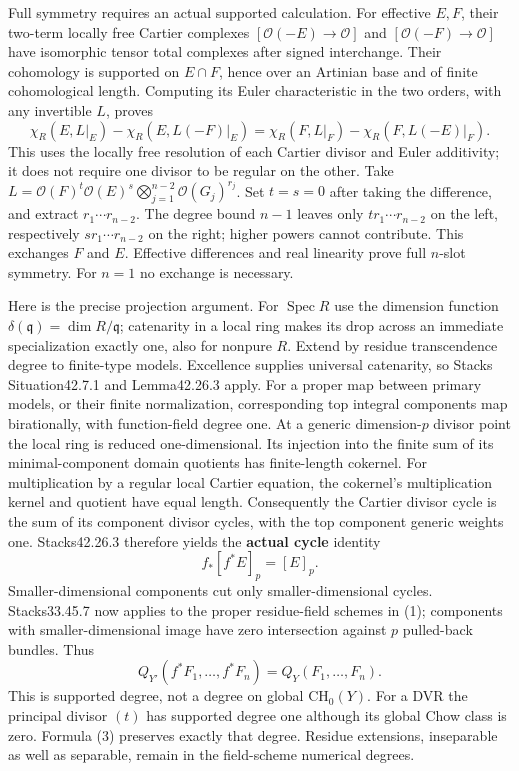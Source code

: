 \documentclass[
  11pt,
]{article}
\begin{document}
Full symmetry requires an actual supported calculation. For effective
\(E,F\), their two-term locally free Cartier complexes
\([\mathcal O(-E)\to\mathcal O]\) and \([\mathcal O(-F)\to\mathcal O]\)
have isomorphic tensor total complexes after signed interchange. Their
cohomology is supported on \(E\cap F\), hence over an Artinian base and
of finite cohomological length. Computing its Euler characteristic in
the two orders, with any invertible \(L\), proves
\[\chi_R(E,L|_E)-\chi_R(E,L(-F)|_E)=\chi_R(F,L|_F)-\chi_R(F,L(-E)|_F).\tag{2}\]
This uses the locally free resolution of each Cartier divisor and Euler
additivity; it does not require one divisor to be regular on the other.
Take
\(L=\mathcal O(F)^t\mathcal O(E)^s\bigotimes_{j=1}^{n-2}\mathcal O(G_j)^{r_j}\).
Set \(t=s=0\) after taking the difference, and extract
\(r_1\cdots r_{n-2}\). The degree bound \(n-1\) leaves only
\(t r_1\cdots r_{n-2}\) on the left, respectively
\(s r_1\cdots r_{n-2}\) on the right; higher powers cannot contribute.
This exchanges \(F\) and \(E\). Effective differences and real linearity
prove full \(n\)-slot symmetry. For \(n=1\) no exchange is necessary.

Here is the precise projection argument. For \(\operatorname{Spec}R\)
use the dimension function \(\delta(\mathfrak q)=\dim R/\mathfrak q\);
catenarity in a local ring makes its drop across an immediate
specialization exactly one, also for nonpure \(R\). Extend by residue
transcendence degree to finite-type models. Excellence supplies
universal catenarity, so Stacks Situation42.7.1 and Lemma42.26.3 apply.
For a proper map between primary models, or their finite normalization,
corresponding top integral components map birationally, with
function-field degree one. At a generic dimension-\(p\) divisor point
the local ring is reduced one-dimensional. Its injection into the finite
sum of its minimal-component domain quotients has finite-length
cokernel. For multiplication by a regular local Cartier equation, the
cokernel's multiplication kernel and quotient have equal length.
Consequently the Cartier divisor cycle is the sum of its component
divisor cycles, with the top component generic weights one.
Stacks42.26.3 therefore yields the \textbf{actual cycle} identity
\[f_*[f^*E]_p=[E]_p.\tag{3}\] Smaller-dimensional components cut only
smaller-dimensional cycles. Stacks33.45.7 now applies to the proper
residue-field schemes in (1); components with smaller-dimensional image
have zero intersection against \(p\) pulled-back bundles. Thus
\[Q_{Y'}(f^*F_1,\ldots,f^*F_n)=Q_Y(F_1,\ldots,F_n).\tag{4}\] This is
supported degree, not a degree on global \(\mathrm{CH}_0(Y)\). For a DVR
the principal divisor \((t)\) has supported degree one although its
global Chow class is zero. Formula (3) preserves exactly that degree.
Residue extensions, inseparable as well as separable, remain in the
field-scheme numerical degrees.
\end{document}
